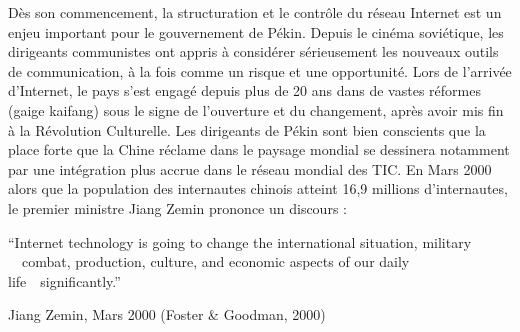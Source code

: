 \bigskip

{\color{black}
D\`es son commencement, la structuration et le contr\^ole du r\'eseau Internet est un enjeu important pour le
gouvernement de P\'ekin. Depuis le cin\'ema sovi\'etique, les dirigeants communistes ont appris \`a consid\'erer
s\'erieusement les nouveaux outils de communication, \`a la fois comme un risque et une opportunit\'e. Lors de
l'arriv\'ee d'Internet, le pays s'est engag\'e depuis plus de 20 ans dans de vastes r\'eformes (gaige kaifang) sous le
signe de l'ouverture et du changement, apr\`es avoir mis fin \`a la R\'evolution Culturelle. Les dirigeants de P\'ekin
sont bien conscients que la place forte que la Chine r\'eclame dans le paysage mondial se dessinera notamment par une
int\'egration plus accrue dans le r\'eseau mondial des TIC. En Mars 2000 alors que la population des internautes
chinois atteint 16,9 millions d'internautes, le premier ministre Jiang Zemin prononce un discours :}


\bigskip

{\color{black}
{}``Internet technology is going to change the international situation, military \ \ combat, production, culture, and
economic aspects of our daily life\ \ significantly.''}

{\raggedleft\color{black}
Jiang Zemin, Mars 2000 (Foster \& Goodman, 2000)
\par}


\bigskip

